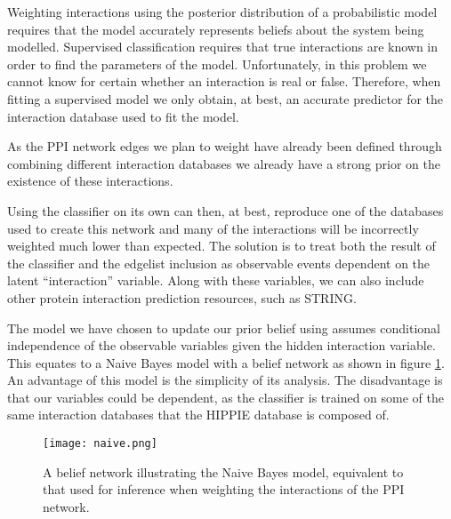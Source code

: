 Weighting interactions using the posterior distribution of a probabilistic model requires that the model accurately represents beliefs about the system being modelled.
Supervised classification requires that true interactions are known in order to find the parameters of the model.
Unfortunately, in this problem we cannot know for certain whether an interaction is real or false.
Therefore, when fitting a supervised model we only obtain, at best, an accurate predictor for the interaction database used to fit the model.

As the \ac{PPI} network edges we plan to weight have already been defined through combining different interaction databases we already have a strong prior on the existence of these interactions.

Using the classifier on its own can then, at best, reproduce one of the databases used to create this network and many of the interactions will be incorrectly weighted much lower than expected.
The solution is to treat both the result of the classifier and the edgelist inclusion as observable events dependent on the latent ``interaction'' variable.
Along with these variables, we can also include other protein interaction prediction resources, such as \ac{STRING}\autocite{von_mering_string:_2005}.

The model we have chosen to update our prior belief using assumes conditional independence of the observable variables given the hidden interaction variable.
This equates to a Naive Bayes model with a belief network as shown in figure \ref{fig:naive}.
An advantage of this model is the simplicity of its analysis.
The disadvantage is that our variables could be dependent, as the classifier is trained on some of the same interaction databases that the \ac{HIPPIE} database is composed of.

\begin{figure}
    \centering
    \texttt{[image: naive.png]}
    \caption{A belief network illustrating the Naive Bayes model, equivalent to that used for inference when weighting the interactions of the \ac{PPI} network.}
    \label{fig:naive}
\end{figure}



